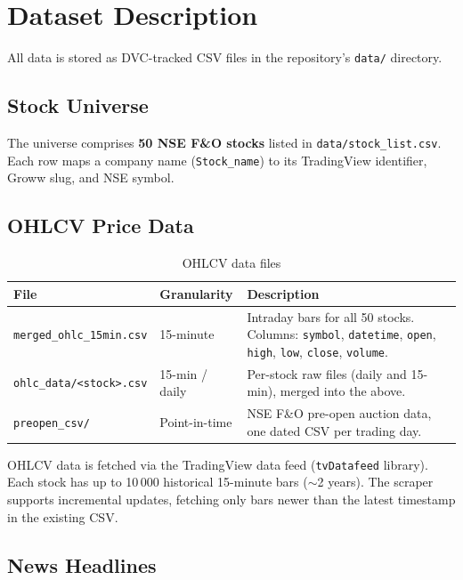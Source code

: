 \documentclass[11pt,a4paper]{article}
\begin{document}
\section{Dataset Description}

All data is stored as DVC-tracked CSV files in the repository's \texttt{data/}
directory.

\subsection{Stock Universe}

The universe comprises \textbf{50 NSE F\&O stocks} listed in
\texttt{data/stock\_list.csv}. Each row maps a company name
(\texttt{Stock\_name}) to its TradingView identifier, Groww slug, and NSE
symbol.

\subsection{OHLCV Price Data}

\begin{table}[H]
\centering
\caption{OHLCV data files}
\begin{tabular}{@{}llp{7cm}@{}}
\toprule
\textbf{File} & \textbf{Granularity} & \textbf{Description} \\
\midrule
\texttt{merged\_ohlc\_15min.csv} & 15-minute & Intraday bars for all 50 stocks.
  Columns: \texttt{symbol}, \texttt{datetime}, \texttt{open}, \texttt{high},
  \texttt{low}, \texttt{close}, \texttt{volume}. \\
\texttt{ohlc\_data/<stock>.csv} & 15-min / daily & Per-stock raw files (daily
  and 15-min), merged into the above. \\
\texttt{preopen\_csv/} & Point-in-time & NSE F\&O pre-open auction data,
  one dated CSV per trading day. \\
\bottomrule
\end{tabular}
\end{table}

OHLCV data is fetched via the TradingView data feed (\texttt{tvDatafeed}
library). Each stock has up to 10\,000 historical 15-minute bars
($\sim$2 years). The scraper supports incremental updates, fetching only
bars newer than the latest timestamp in the existing CSV.

\subsection{News Headlines}
\end{document}
